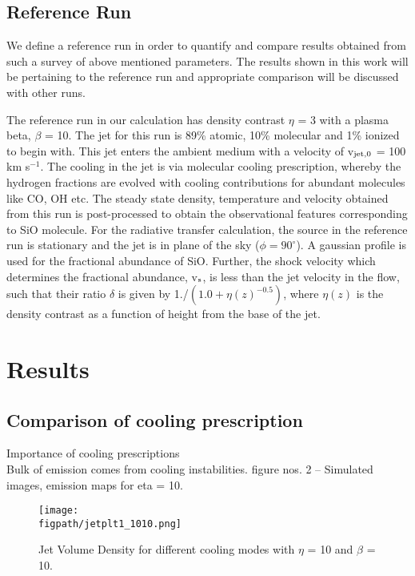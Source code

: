 \documentclass[useAMS,usenatbib,letters]{mn2e}
\newcommand{\figpath}{PFIGS/}
\begin{document}
\subsection{Reference Run}
\label{ssec:refrun}
We define a reference run in order to quantify and compare results obtained from such a
survey of above mentioned parameters. The results shown in this work will be
pertaining to the reference run and appropriate comparison will be
discussed with other runs.
%

The reference run in our calculation has density contrast $\eta$ = 3
with a plasma beta, $\beta$ = 10. The jet for this run is 89\% atomic,
10\% molecular and 1\% ionized to begin with. This jet enters the
ambient medium with a velocity of v$_{\rm jet,0}$ = 100 km
s$^{-1}$. The cooling in the jet is
via molecular cooling prescription, whereby the hydrogen fractions are
evolved with cooling contributions for abundant molecules like CO, OH
etc. The steady state density, temperature and velocity obtained from this 
run is post-processed to obtain the observational features
corresponding to SiO molecule. 
For the radiative transfer calculation, the source in the reference
run is stationary and the jet is in plane of the sky ($\phi =
90^{\circ}$). A gaussian profile is used for the fractional abundance
of SiO.
Further, the shock velocity which determines
the fractional abundance, v$_{\rm s}$, is less than the jet velocity in the
flow, such that their ratio $\delta$ is given by 1./$(1.0 +
\eta(z)^{-0.5})$, where $\eta(z)$ is the density contrast as a
function of height from the base of the jet.

\section{Results}


\subsection{Comparison of cooling prescription}
\label{ssec:coolres}
Importance of cooling prescriptions\\
Bulk of emission comes from cooling instabilities.
figure nos. 2 -- Simulated images, emission maps for eta = 10.
\begin{figure*}
 \texttt{[image: \\figpath/jetplt1\_1010.png]}
 \caption{Jet Volume Density for different cooling modes with
   $\eta$ = 10 and $\beta$ = 10.}
\label{grid}
\end{figure*}
\end{document}
